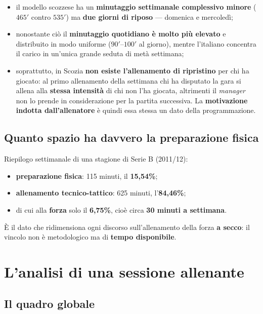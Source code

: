 \begin{itemize}
  \item il modello scozzese ha un \textbf{minutaggio settimanale complessivo minore} ($465'$ contro
    $535'$) ma \textbf{due giorni di riposo} --- domenica e mercoledì;
  \item nonostante ciò il \textbf{minutaggio quotidiano è molto più elevato} e distribuito in modo
    uniforme ($90'$--$100'$ al giorno), mentre l'italiano concentra il carico in
    un'unica grande seduta di metà settimana;
  \item soprattutto, in Scozia \textbf{non esiste l'allenamento di ripristino} per chi ha giocato:
    al primo allenamento della settimana chi ha disputato la gara si allena alla \textbf{stessa
    intensità} di chi non l'ha giocata, altrimenti il \textit{manager} non lo prende in
    considerazione per la partita successiva. La \textbf{motivazione indotta dall'allenatore} è
    quindi essa stessa un dato della programmazione.
\end{itemize}

\subsection{Quanto spazio ha davvero la preparazione fisica}

Riepilogo settimanale di una stagione di Serie B (2011/12):

\begin{itemize}
  \item \textbf{preparazione fisica}: 115 minuti, il \textbf{15,54\%};
  \item \textbf{allenamento tecnico-tattico}: 625 minuti, l'\textbf{84,46\%};
  \item di cui alla \textbf{forza} solo il \textbf{6,75\%}, cioè circa \textbf{30 minuti a
    settimana}.
\end{itemize}

È il dato che ridimensiona ogni discorso sull'allenamento della forza \textbf{a secco}: il vincolo
non è metodologico ma di \textbf{tempo disponibile}.

\section{L'analisi di una sessione allenante}

\subsection{Il quadro globale}

